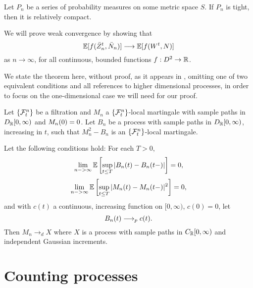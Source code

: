 \begin{theorem} \label{T: Prohorov}
	Let $P_n$ be a series of probability measures on some metric space $S$. If $P_n$ is tight, then it is relatively compact.
\end{theorem}



We will prove weak convergence by showing that
\begin{equation}
\mathbb{E}[ f(\bar{Z}^t_n, \bar{N}_n) ] \longrightarrow \mathbb{E}[ f(W^t, N) ]
\end{equation}
as $n \rightarrow \infty$, 
for all continuous, bounded functions 
$f: D^2 \rightarrow \mathbb{R}$.

We state the theorem here, without proof, as it appears in \cite[Theorem 1.4, p.339 f.]{Ethier.2005},
omitting one of two equivalent conditions and all references to higher dimensional processes,
in order to focus on the one-dimensional case we will need for our proof.

\begin{theorem} \label{T: functional CLT martingales}
	Let $\{\mathcal{F}^n_{t}\}$ be a filtration and $M_n$ a $\{\mathcal{F}^n_{t}\}$-local martingale with sample paths in $D_{\mathbb{R}}[0,\infty)$ and $M_n(0)=0$.
	Let $B_n$ be a process with sample paths in $D_{\mathbb{R}}[0,\infty)$, increasing in $t$, such that $M_n^2 - B_n$ is an $\{\mathcal{F}^n_{t}\}$-local martingale.
	
	Let the following conditions hold:
	For each $T>0$,
	\begin{equation} \label{E: cond1 CLT}
	\lim_{n->\infty} \mathbb{E} \left[ 
		\sup_{t \leq T} | B_n(t) - B_n(t-)|
	 \right] = 0,
	\end{equation}
	\begin{equation} \label{E: cond2 CLT}
	\lim_{n->\infty} \mathbb{E} \left[ 
		\sup_{t \leq T} | M_n(t) - M_n(t-)|^2
	 \right] = 0,
	\end{equation}
	and with $c(t)$ a continuous, increasing function on $[0, \infty)$, $c(0) = 0$, let
	\begin{equation} \label{E: cond3 CLT}
	B_n(t) \longrightarrow_p c(t).
	\end{equation}
	Then $M_n \longrightarrow_d X$ where $X$ is a process with sample paths in $C_{\mathbb{R}}[0,\infty)$ and independent Gaussian increments.
\end{theorem}



\section{Counting processes}
